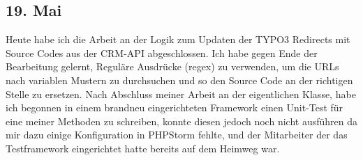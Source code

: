 \subsection{19. Mai}
Heute habe ich die Arbeit an der Logik zum Updaten der TYPO3 Redirects mit Source Codes aus der CRM-API abgeschlossen. Ich habe gegen Ende der Bearbeitung gelernt, Reguläre Ausdrücke (regex) zu verwenden, um die URLs nach variablen Mustern zu durchsuchen und so den Source Code an der richtigen Stelle zu ersetzen. 
Nach Abschluss meiner Arbeit an der eigentlichen Klasse, habe ich begonnen in einem brandneu eingerichteten Framework einen Unit-Test für eine meiner Methoden zu schreiben, konnte diesen jedoch noch nicht ausführen da mir dazu einige Konfiguration in PHPStorm fehlte, und der Mitarbeiter der das Testframework eingerichtet hatte bereits auf dem Heimweg war.